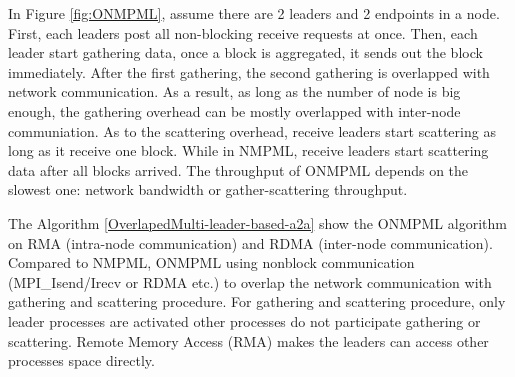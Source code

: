 In Figure \ref{fig:ONMPML}, assume there are 2 leaders and 2 endpoints in a node. 
First, each leaders post all non-blocking receive requests at once.
Then, each leader start gathering data, once a block is aggregated, it sends out the block immediately.
After the first gathering, the second gathering is overlapped with network communication.
As a result, as long as the number of node is big enough, the gathering overhead can be mostly overlapped with inter-node communiation.
As to the scattering overhead, receive leaders start scattering as long as it receive one block.
While in NMPML, receive leaders start scattering data after all blocks arrived.
The throughput of ONMPML depends on  the slowest one: network bandwidth or gather-scattering throughput.

The Algorithm \ref{OverlapedMulti-leader-based-a2a} show the ONMPML algorithm on RMA (intra-node communication) and RDMA (inter-node communication).
Compared to NMPML, ONMPML using nonblock communication (MPI\_Isend/Irecv or RDMA etc.) to overlap the network communication with gathering and scattering procedure.
For gathering and scattering procedure, only leader processes are activated other processes do not participate gathering or scattering.
Remote Memory Access (RMA) makes the leaders can access other processes space directly.

